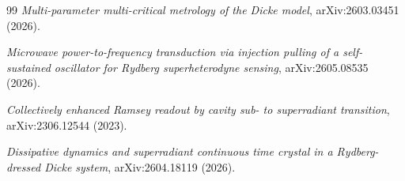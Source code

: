 \documentclass[11pt,a4paper]{article}
\begin{document}
\begin{thebibliography}{99}
 \emph{Multi-parameter multi-critical metrology of the Dicke model},
  arXiv:2603.03451 (2026).

 \emph{Microwave power-to-frequency transduction via injection pulling
  of a self-sustained oscillator for Rydberg superheterodyne sensing}, arXiv:2605.08535 (2026).

 \emph{Collectively enhanced Ramsey readout by cavity sub- to
  superradiant transition}, arXiv:2306.12544 (2023).

 \emph{Dissipative dynamics and superradiant continuous time crystal
  in a Rydberg-dressed Dicke system}, arXiv:2604.18119 (2026).

\end{thebibliography}
\end{document}
